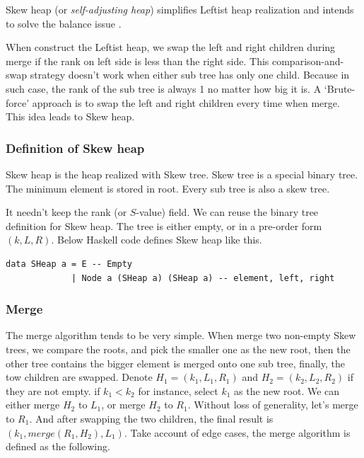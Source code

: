 \documentclass[b5paper]{article}
\begin{document}
Skew heap (or {\em self-adjusting heap}) simplifies Leftist heap realization
and intends to solve the balance issue\cite{wiki-skew-heap} \cite{self-adjusting-heaps}.

When construct the Leftist heap, we swap the left and right children during merge
if the rank on left side is less than the right side. This comparison-and-swap strategy
doesn't work when either sub tree has only one child. Because
in such case, the rank of the sub tree is always 1 no matter how
big it is. A `Brute-force' approach is to swap the left and right children
every time when merge. This idea leads to Skew heap.

\subsubsection{Definition of Skew heap}

Skew heap is the heap realized with Skew tree. Skew tree is a special
binary tree. The minimum element is stored in root. Every sub tree is
also a skew tree.

It needn't keep the rank (or $S$-value) field. We can reuse the
binary tree definition for Skew heap. The tree is either empty,
or in a pre-order form $(k, L, R)$. Below Haskell code defines
Skew heap like this.

\lstset{language=Haskell}
\begin{lstlisting}
data SHeap a = E -- Empty
             | Node a (SHeap a) (SHeap a) -- element, left, right
\end{lstlisting}

\subsubsection{Merge}

The merge algorithm tends to be very simple.
When merge two non-empty Skew
trees, we compare the roots, and pick the smaller
one as the new root, then the other tree contains the bigger
element is merged onto one sub tree, finally,
the tow children are swapped. Denote $H_1 = (k_1, L_1, R_1)$
and $H_2 =(k_2, L_2, R_2)$ if they are not empty.
if $k_1 < k_2$ for instance, select $k_1$ as the new root. We can
either merge $H_2$ to $L_1$, or merge $H_2$ to $R_1$.
Without loss of generality, let's merge to $R_1$.
And after swapping the two children, the final result
is $(k_1, merge(R_1, H_2), L_1)$. Take account of
edge cases, the merge algorithm is defined as the
following.
\end{document}
